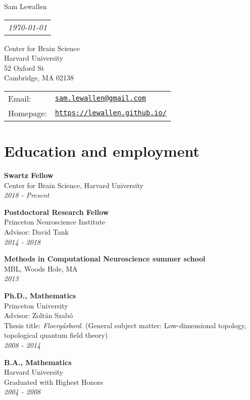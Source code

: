 \documentclass[letterpaper]{article}
\makeatletter
\def\name{Sam Lewallen}
\def\email{sam.lewallen@gmail.com}
\def\url{https://lewallen.github.io/}
\def\address{
Center for Brain Science \\
Harvard University \\
52 Oxford St \\
Cambridge, MA 02138  
}
\def\lsk{\\[.2em]}
\renewenvironment{itemize}{
  \begin{list}{}{
    \setlength{\leftmargin}{1.5em}
  }
}{
  \end{list}
}
\makeatother
\begin{document}
{\huge \name}
\hfill%
\begin{tabular}[t]{l@{}}
\textit{\today}
\end{tabular}
\vspace{0.4in}

\begin{minipage}{0.45\linewidth}
\address
\end{minipage}
\begin{minipage}{0.45\linewidth}
  \begin{tabular}{ll}
    Email: & \href{mailto:\email}{\tt \email} \\
    Homepage: & \href{\url}{\tt \url} \\
  \end{tabular}
\end{minipage}

\section*{Education and employment}
\begin{itemize}
\item \textbf{Swartz Fellow} \lsk
Center for Brain Science, Harvard University \lsk
\textit{2018 - Present} \\

\item \textbf{Postdoctoral Research Fellow} \lsk
Princeton Neuroscience Institute \lsk
Advisor: David Tank \lsk
\textit{2014 - 2018} \\

\item \textbf{Methods in Computational Neuroscience summer school} \lsk
MBL, Woods Hole, MA \lsk
\textit{2013} \\

\item \textbf{Ph.D., Mathematics} \lsk
Princeton University \lsk
Advisor: Zolt\'{a}n Szab\'{o} \lsk
Thesis title: \textit{Floerg\aa sbord}. (General subject matter: Low-dimensional topology, topological quantum field theory) \lsk
\textit{2008 - 2014} \\
\item \textbf{B.A., Mathematics} \lsk
Harvard University \lsk
Graduated with Highest Honors \lsk
\textit{2004 - 2008}
  \end{itemize}
\end{document}
